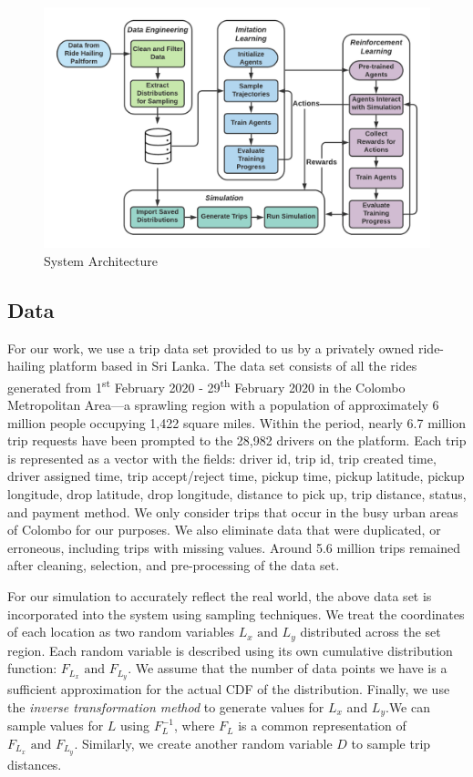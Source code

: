 \documentclass[runningheads]{llncs}
\begin{document}
\begin{figure}[h]
\centering
\includegraphics[width=0.97\columnwidth]{System Architecture.png} %
\caption{System Architecture}
\label{figsysarch}
\end{figure}

\subsection{Data}

For our work, we use a trip data set provided to us by a privately owned ride-hailing platform based in Sri Lanka. The data set consists of all the rides generated from 1\textsuperscript{st} February 2020 - 29\textsuperscript{th} February 2020 in the Colombo Metropolitan Area---a sprawling region with a population of approximately 6 million people occupying 1,422 square miles. Within the period, nearly 6.7 million trip requests have been prompted to the 28,982 drivers on the platform. Each trip is represented as a vector with the fields: driver id, trip id, trip created time, driver assigned time, trip accept/reject time, pickup time, pickup latitude, pickup longitude, drop latitude, drop longitude, distance to pick up, trip distance, status, and payment method. We only consider trips that occur in the busy urban areas of Colombo for our purposes. We also eliminate data that were duplicated, or erroneous, including trips with missing values. Around 5.6 million trips remained after cleaning, selection, and pre-processing of the data set.

For our simulation to accurately reflect the real world, the above data set is incorporated into the system using sampling techniques. We treat the coordinates of each location as two random variables \(L_x \text{ and } L_y\) distributed across the set region. Each random variable is described using its own cumulative distribution function: \(F_{L_x} \text{ and } F_{L_y}\). We assume that the number of data points we have is a sufficient approximation for the actual CDF of the distribution. Finally, we use the \textit{inverse transformation method} to generate values for \(L_x\) and \(L_y\).We can sample values for \(L\) using \(F_L^{-1}\), where \(F_L\) is a common representation of \(F_{L_x} \text{ and } F_{L_y}\). Similarly, we create another random variable \(D\) to sample trip distances.
\end{document}
